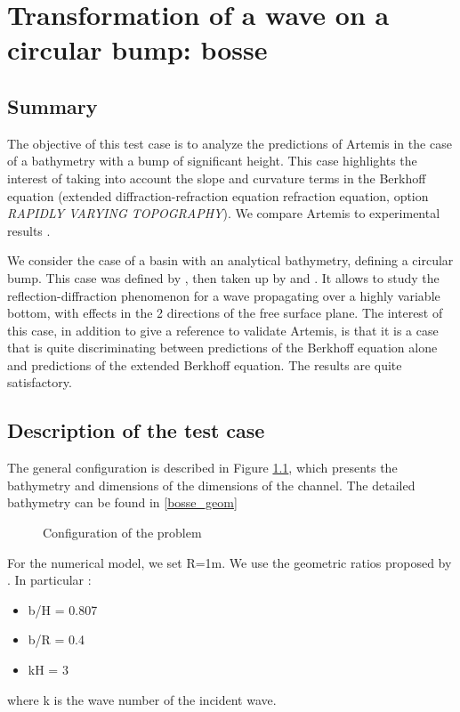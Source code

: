 

\chapter{Transformation of a wave on a circular bump: bosse}

\section{Summary}

The objective of this test case is to analyze the predictions of Artemis in
the case of a bathymetry with a bump of significant height. This case
highlights the interest of taking into account the slope and curvature terms
in the Berkhoff equation (extended diffraction-refraction equation
refraction equation, option {\it RAPIDLY VARYING TOPOGRAPHY}). We compare
Artemis to experimental results \cite{Williams1980}.

We consider the case of a basin with an analytical bathymetry, defining a
circular bump. This case was defined by \cite{Williams1980}, then taken up by 
\cite{Chandrasekera1997} and \cite{Lee2004}. It allows to study the
reflection-diffraction phenomenon for a wave propagating over a highly
variable bottom, with effects in the 2 directions of the free surface plane.
The interest of this case, in addition to give a reference to validate Artemis,
is that it is a case that is quite discriminating between predictions of the
Berkhoff equation alone and predictions of the extended Berkhoff equation.
The results are quite satisfactory.

\section{Description of the test case}

The general configuration is described in Figure \ref{fig:bosse_config}, which
presents the bathymetry and dimensions of the dimensions of the channel.
The detailed bathymetry can be found in \ref{bosse_geom}

\begin{figure}[h]
\begin{center}
\end{center}
\caption{Configuration of the problem}
\label{fig:bosse_config}
\end{figure}

For the numerical model, we set R=1m. We use the geometric ratios proposed by
\cite{Williams1980}. In particular :
\begin{itemize}
\item b/H = 0.807
\item b/R = 0.4
\item kH = 3
\end{itemize}
where k is the wave number of the incident wave. 

